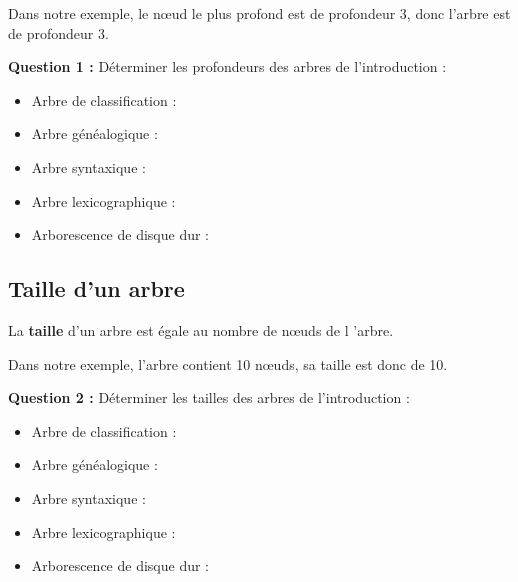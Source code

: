 \documentclass[french]{article}
\theoremstyle{plain}
\begin{document}
Dans notre exemple, le nœud le plus profond est de profondeur 3, donc l'arbre est de profondeur 3.

\vspace*{0.5cm}

\textbf{Question 1 :} Déterminer les profondeurs des arbres de l'introduction :

\begin{tcolorbox}[colback=blue!5!white,colframe=blue!75!black,title=Réponses :]
	
\begin{itemize}[label=$\triangleright$]
	\item Arbre de classification :
	\item Arbre généalogique :
	\item Arbre syntaxique :
	\item Arbre lexicographique :
	\item Arborescence de disque dur :
\end{itemize}
	
\end{tcolorbox}

\subsection{Taille d'un arbre}

\begin{tcolorbox}[colback=red!5!white,colframe=red!75!black,title=A retenir !]
	
La \textbf{taille} d'un arbre est égale au nombre de nœuds de l 'arbre.
	
\end{tcolorbox}

Dans notre exemple, l'arbre contient 10 nœuds, sa taille est donc de 10.

\newpage

\textbf{Question 2 :} Déterminer les tailles des arbres de l'introduction :

\begin{tcolorbox}[colback=blue!5!white,colframe=blue!75!black,title=Réponses :]
	
	\begin{itemize}[label=$\triangleright$]
		\item Arbre de classification :
		\item Arbre généalogique :
		\item Arbre syntaxique :
		\item Arbre lexicographique :
		\item Arborescence de disque dur :
	\end{itemize}
	
\end{tcolorbox}
\end{document}
